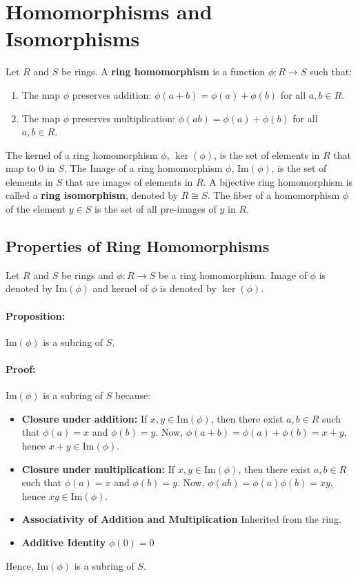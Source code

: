 \documentclass[12pt, oneside]{book}
\begin{document}
\section{Homomorphisms and Isomorphisms}
Let \(R\) and \(S\) be rings.
A \textbf{ring homomorphism} is a function \(\phi: R \to S\) such that:
\begin{enumerate}
    \item The map \(\phi\) preserves addition: \(\phi(a + b) = \phi(a) + \phi(b)\) for all \(a, b \in R\).
    \item The map \(\phi\) preserves multiplication: \(\phi(ab) = \phi(a) + \phi(b)\) for all \(a, b \in R\).
\end{enumerate}
The kernel of a ring homomorphism \(\phi\), \(\ker (\phi)\), is the set of elements in \(R\) that map to \(0\) in \(S\).
The Image of a ring homomorphism \(\phi\), \(\text{Im}(\phi)\), is the set of elements in \(S\) that are images of elements in \(R\).
A bijective ring homomorphism is called a \textbf{ring isomorphism}, denoted by \(R \cong S\).
The fiber of a homomorphism \(\phi\) of the element \(y \in S\) is the set of all pre-images of \(y\) in \(R\).

\subsection{Properties of Ring Homomorphisms}
Let \(R\) and \(S\) be rings and \(\phi: R \to S\) be a ring homomorphism.
Image of \(\phi\) is denoted by \(\text{Im}(\phi)\) and kernel of \(\phi\) is denoted by \(\ker(\phi)\).
\paragraph{Proposition:} \(\text{Im}(\phi)\) is a subring of \(S\).
\paragraph{Proof:} \(\text{Im}(\phi)\) is a subring of \(S\) because:
\begin{itemize}
    \item \textbf{Closure under addition:} If \(x, y \in \text{Im}(\phi)\), then there exist \(a, b \in R\) such that \(\phi(a) = x\) and \(\phi(b) = y\).
    Now, \(\phi(a + b) = \phi(a) + \phi(b) = x + y\), hence \(x + y \in \text{Im}(\phi)\).
    \item \textbf{Closure under multiplication:} If \(x, y \in \text{Im}(\phi)\), then there exist \(a, b \in R\) such that \(\phi(a) = x\) and \(\phi(b) = y\).
    Now, \(\phi(ab) = \phi(a)\phi(b) = xy\), hence \(xy \in \text{Im}(\phi)\).
    \item \textbf{Associativity of Addition and Multiplication} Inherited from the ring.
    \item \textbf{Additive Identity} \(\phi(0) = 0\)
\end{itemize}
Hence, \(\text{Im}(\phi)\) is a subring of \(S\).
\end{document}
